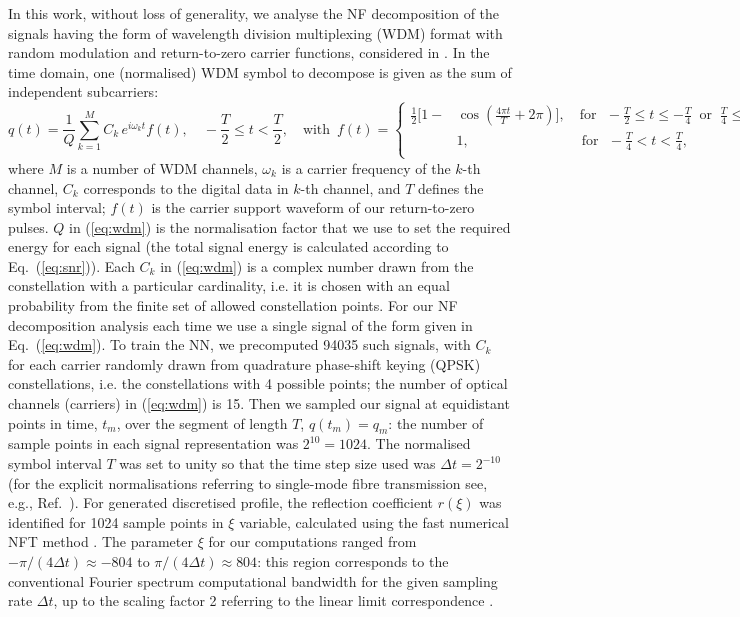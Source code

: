 In this work, without loss of generality, we analyse the NF decomposition of the signals having the form of wavelength division multiplexing (WDM) format with random modulation and return-to-zero carrier functions, considered in \cite{srf18,tsr19}. In the time domain, one (normalised) WDM symbol to decompose is given as the sum of independent subcarriers:
\begin{equation}
q(t) = \frac{1}{Q} \sum_{k=1}^{M} C_k \, e^{i \omega_k t} f(t) {,} \quad -\frac{T}{2} \le t < \frac{T}{2} {,} \quad \text{with} \, \, \, 
f(t)=
\left\{
\begin{aligned}
    \frac{1}{2}\Big[1 - &\cos\left(\frac{4\pi t}{T} + 2\pi \right)\Big] {,}  \quad  \text{for} \, \, \, \, -\frac{T}{2} \le t \le -\frac{T}{4} \; \; \text{or} \; \; \frac{T}{4} \le t \le \frac{T}{2}, \\
    &1 {,}  \qquad \qquad \qquad \qquad \text{for} \, \, \, \, -\frac{T}{4} < t < \frac{T}{4}, \\
\end{aligned}
\right.
\label{eq:wdm}
\end{equation}
where $M$ is a number of WDM channels, $\omega_k$ is a carrier frequency of the $k$-th channel, $C_k$ corresponds to the digital data in $k$-th channel, and $T$ defines the symbol interval; $f(t)$ is the carrier support waveform of our return-to-zero pulses.
$Q$ in (\ref{eq:wdm}) is the normalisation factor that we use to set the required energy for each signal (the total signal energy is calculated according to Eq.~(\ref{eq:snr})).
Each $C_k$ in (\ref{eq:wdm}) is a complex number drawn from the constellation with a particular cardinality, i.e. it is chosen with an equal probability from the finite set of allowed constellation points. For our NF decomposition analysis each time we use a single signal of the form given in Eq.~(\ref{eq:wdm}). To train the NN, we precomputed 94035 such signals, with $C_k$ for each carrier randomly drawn from quadrature phase-shift keying (QPSK) constellations, i.e. the constellations with 4 possible points; the number of optical channels (carriers) in (\ref{eq:wdm}) is 15. Then we sampled our signal at equidistant points in time, $t_m$, over the segment of length $T$, $q(t_m)=q_m$: the number of sample points in each signal representation was $2^{10}= 1024$. The normalised symbol interval $T$ was set to unity so that the time step size used was $\Delta t = 2^{-10}$ (for the explicit normalisations referring to single-mode fibre transmission see, e.g., Ref.~\cite{tplwfkd17}).
For generated discretised profile, the reflection coefficient $r(\xi)$ was identified for 1024 sample points in $\xi$ variable,  calculated using the fast numerical NFT method \cite{FNFT2018}. The  parameter $\xi$ for our computations ranged from $-\pi / (4 \Delta t) \approx -804$ to $\pi / (4 \Delta t) \approx 804$: this region corresponds to the conventional Fourier spectrum computational bandwidth for the given sampling rate $\Delta t$, up to the scaling factor 2 referring to the linear limit correspondence \cite{pdt13}.
